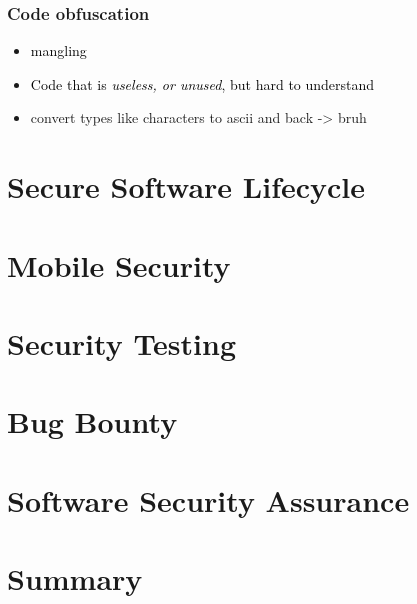 \documentclass[main.tex,fontsize=8pt,paper=a4,paper=portrait,DIV=calc,]{scrartcl}
\begin{document}
\subsubsection{Code obfuscation}
\begin{itemize}
\item \textcolor{black}{mangling}
\item \textcolor{black}{Code that is \emph{useless, or unused}, but hard to understand}
\item convert types like characters to ascii and back -> bruh
\end{itemize} 


\section{Secure Software Lifecycle}

\section{Mobile Security}

\section{Security Testing}

\section{Bug Bounty}

\section{Software Security Assurance}

\section{Summary}
\end{document}
